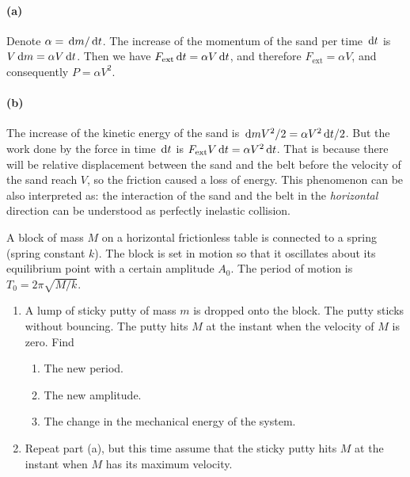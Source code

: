 \documentclass{article}
\begin{document}
\begin{solution}
	\paragraph{(a)} Denote $\alpha = \,\mathrm{d} m/\,\mathrm{d} t$. The increase of the momentum of the sand per time $\,\mathrm{d} t$ is $V \,\mathrm{d} m = \alpha V \,\mathrm{d} t$. Then we have $F_{\mathrm{ext}} \,\mathrm{d} t = \alpha V \,\mathrm{d} t$, and therefore $F_{\mathrm{ext}} = \alpha V$, and consequently $P= \alpha V^2$. 

	\paragraph{(b)} The increase of the kinetic energy of the sand is $\,\mathrm{d} m V^2/2 = \alpha V^2 \,\mathrm{d} t/2$. But the work done by the force in time $\,\mathrm{d} t$ is $F_{\mathrm{ext}} V\,\mathrm{d} t = \alpha V^2 \,\mathrm{d} t$. That is because there will be relative displacement between the sand and the belt before the velocity of the sand reach $V$, so the friction caused a loss of energy. This phenomenon can be also interpreted as: the interaction of the sand and the belt in the \textit{horizontal} direction can be understood as perfectly inelastic collision.
\end{solution}



\begin{problem}
A block of mass $M$ on a horizontal frictionless table is connected to a spring (spring constant $k$). The block is set in motion so that it oscillates about its equilibrium point with a certain amplitude $A_0$. The period of motion is $T_0=2\pi\sqrt{M/k}$.
\begin{enumerate}
  \item[(a)] A lump of sticky putty of mass $m$ is dropped onto the block. The putty sticks without bouncing. The putty hits $M$ at the instant when the velocity of $M$ is zero. Find
  \begin{enumerate}
    \item[(1)] The new period.
    \item[(2)] The new amplitude.
    \item[(3)] The change in the mechanical energy of the system.
  \end{enumerate}
  \item[(b)] Repeat part (a), but this time assume that the sticky putty hits $M$ at the instant when $M$ has its maximum velocity.
\end{enumerate}
\end{problem}
\end{document}
